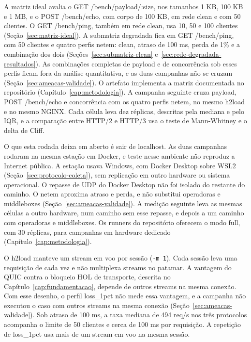 A matriz ideal avalia o GET /bench/payload/:size, nos tamanhos 1 KB, 100 KB e 1 MB, e o POST /bench/echo, com corpo de 100 KB, em rede clean e com 50 clientes. O GET /bench/ping, também em rede clean, usa 10, 50 e 100 clientes (Seção~\ref{sec:matriz-ideal}). A submatriz degradada fica em GET /bench/ping, com 50 clientes e quatro perfis netem: clean, atraso de 100 ms, perda de 1\% e a combinação dos dois (Seções~\ref{sec:submatriz-clean} e~\ref{sec:rede-degradada-resultados}). As combinações completas de payload e de concorrência sob esses perfis ficam fora da análise quantitativa, e as duas campanhas não se cruzam (Seção~\ref{sec:ameacas-validade}). O artefato implementa a matriz documentada no repositório (Capítulo~\ref{cap:metodologia}). A campanha seguinte cruza payload, POST /bench/echo e concorrência com os quatro perfis netem, no mesmo h2load e no mesmo NGINX. Cada célula leva dez réplicas, descritas pela mediana e pelo IQR, e a comparação entre HTTP/2 e HTTP/3 usa o teste de Mann-Whitney e o delta de Cliff.

O que esta rodada deixa em aberto é sair de localhost. As duas campanhas rodaram na mesma estação em Docker, e teste nesse ambiente não reproduz a Internet pública. A estação usava Windows, com Docker Desktop sobre WSL2 (Seção~\ref{sec:protocolo-coleta}), sem replicação em outro hardware ou sistema operacional. O repasse de UDP do Docker Desktop não foi isolado do restante do caminho. O netem aproxima atraso e perda, e não substitui operadoras e middleboxes (Seção~\ref{sec:ameacas-validade}). A medição seguinte leva as mesmas células a outro hardware, num caminho sem esse repasse, e depois a um caminho com operadoras e middleboxes. Os runners do repositório oferecem o modo full, com 30 réplicas, para campanhas em hardware dedicado (Capítulo~\ref{cap:metodologia}).

O h2load manteve um stream em voo por sessão (\texttt{-m 1}). Cada sessão leva uma requisição de cada vez e não multiplexa streams no patamar. A vantagem do QUIC contra o bloqueio HOL de transporte, descrita no Capítulo~\ref{cap:fundamentacao}, depende de outros streams na mesma conexão. Com esse desenho, o perfil loss\_1pct não mede essa vantagem, e a campanha não executou o caso com outros streams na mesma conexão (Seção~\ref{sec:ameacas-validade}). Sob atraso de 100 ms, a taxa mediana de 494 req/s nos três protocolos acompanha o limite de 50 clientes e cerca de 100 ms por requisição. A repetição de loss\_1pct usa mais de um stream em voo na mesma sessão.

